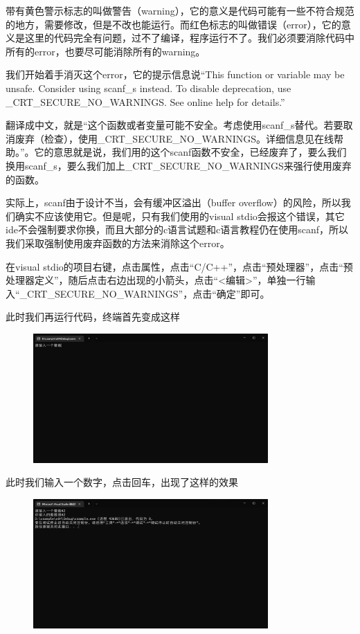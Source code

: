 带有黄色警示标志的叫做警告（warning），它的意义是代码可能有一些不符合规范的地方，需要修改，但是不改也能运行。而红色标志的叫做错误（error），它的意义是这里的代码完全有问题，过不了编译，程序运行不了。我们必须要消除代码中所有的error，也要尽可能消除所有的warning。

我们开始着手消灭这个error，它的提示信息说“This function or variable may be unsafe. Consider using scanf\_s instead. To disable deprecation, use \_CRT\_SECURE\_NO\_WARNINGS. See online help for details.”

翻译成中文，就是“这个函数或者变量可能不安全。考虑使用scanf\_s替代。若要取消废弃（检查），使用\_CRT\_SECURE\_NO\_WARNINGS。详细信息见在线帮助。”。它的意思就是说，我们用的这个scanf函数不安全，已经废弃了，要么我们换用scanf\_s，要么我们加上\_CRT\_SECURE\_NO\_WARNINGS来强行使用废弃的函数。

实际上，scanf由于设计不当，会有缓冲区溢出（buffer overflow）的风险，所以我们确实不应该使用它。但是呢，只有我们使用的visual stdio会报这个错误，其它ide不会强制要求你换，而且大部分的c语言试题和c语言教程仍在使用scanf，所以我们采取强制使用废弃函数的方法来消除这个error。

在visual stdio的项目右键，点击属性，点击“C/C++”，点击“预处理器”，点击“预处理器定义”，随后点击右边出现的小箭头，点击“<编辑>”，单独一行输入“\_CRT\_SECURE\_NO\_WARNINGS”，点击“确定”即可。

此时我们再运行代码，终端首先变成这样

\begin{figure}[H]
    \centering
    \includegraphics[width=0.8\textwidth, height=0.3\textheight]{images/1scanf首次.png}
\end{figure}

此时我们输入一个数字，点击回车，出现了这样的效果

\begin{figure}[H]
    \centering
    \includegraphics[width=0.8\textwidth, height=0.3\textheight]{images/1scanf完成.png}
\end{figure}

